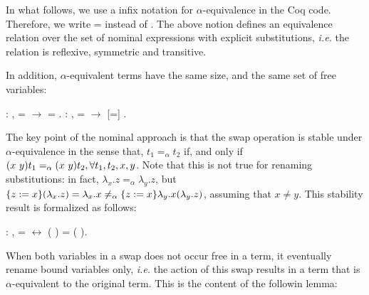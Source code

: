 In what follows, we use a infix notation for $\alpha$-equivalence in the Coq code. Therefore, we write  =  instead of   . The above notion defines an equivalence relation over the set  of nominal expressions with explicit substitutions, {\it i.e.} the  relation is reflexive, symmetric and transitive. 
\begin{coqdoccode}
\end{coqdoccode}
In addition, $\alpha$-equivalent terms have the same size, and the same set of free variables: 
\begin{coqdoccode}
\coqdocemptyline
\coqdocnoindent
{} : \coqdockw{\ensuremath{\forall}}  ,  =  \ensuremath{\rightarrow}   =  .\coqdoceol
\coqdocemptyline
\coqdocnoindent
{}  : \coqdockw{\ensuremath{\forall}}  ,  =  \ensuremath{\rightarrow}   [=]  .\coqdoceol
\coqdocemptyline
\coqdocemptyline
\end{coqdoccode}
The key point of the nominal approach is that the swap operation is stable under $\alpha$-equivalence in the sense that, $t_1 =_\alpha t_2$ if, and only if $\swap{x}{y}{t_1} =_\alpha \swap{x}{y}{t_2}, \forall t_1, t_2, x, y$. Note that this is not true for renaming substitutions: in fact, $\lambda_x.z =_\alpha \lambda_y.z$, but $\metasub{(\lambda_x.z)}{z}{x} = \lambda_x.x \neq_\alpha \metasub{\lambda_y.x (\lambda_y.z)}{z}{x}$, assuming that $x \neq y$. This stability result is formalized as follows: 
\begin{coqdoccode}
\coqdocemptyline
\coqdocnoindent
{} : \coqdockw{\ensuremath{\forall}}    ,  =  \ensuremath{\leftrightarrow} (   ) = (   ).\coqdoceol
\coqdocemptyline
\coqdocemptyline
\end{coqdoccode}
When both variables in a swap does not occur free in a term, it eventually rename bound variables only, {\it i.e.} the action of this swap results in a term that is $\alpha$-equivalent to the original term. This is the content of the followin lemma:
